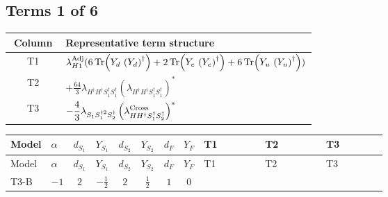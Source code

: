 \documentclass[8pt]{article}
\begin{document}
\begin{landscape}
\subsection*{Terms 1 of 6}
\begin{center}
\begin{tabular}{@{}c >{\raggedright\arraybackslash}p{0.82\linewidth}@{}}
\toprule
Column & Representative term structure \\
\midrule
T1 & \(\displaystyle {\lambda_{H1}^{\rm Adj}} (6 \operatorname{Tr}\!\left({Y_d}\,\left({Y_d}\right)^{\dagger}\right)+2 \operatorname{Tr}\!\left({Y_e}\,\left({Y_e}\right)^{\dagger}\right)+6 \operatorname{Tr}\!\left({Y_u}\,\left({Y_u}\right)^{\dagger}\right))\) \\
\midrule
T2 & \(\displaystyle +\frac{64}{3} {\lambda_{H^\dagger H^\dagger S_1^\dagger S_1^\dagger}} \left({\lambda_{H^\dagger H^\dagger S_1^\dagger S_1^\dagger}}\right)^{*}\) \\
\midrule
T3 & \(\displaystyle -\frac{4}{3} {\lambda_{S_1 S_1^{\dagger 2}S_2^\dagger}} \left({\lambda_{H H^\dagger S_1^\dagger S_2^\dagger}^{\rm Cross}}\right)^{*}\) \\
\midrule
\bottomrule
\end{tabular}
\end{center}
\smallskip
\tiny
\begin{longtable}{@{}llcccccc >{\raggedright\arraybackslash}p{0.21\linewidth} >{\raggedright\arraybackslash}p{0.21\linewidth} >{\raggedright\arraybackslash}p{0.21\linewidth}@{}}
\toprule
Model & $\alpha$ & $d_{S_1}$ & $Y_{S_1}$ & $d_{S_2}$ & $Y_{S_2}$ & $d_F$ & $Y_F$ & T1 & T2 & T3 \\
\midrule
\endfirsthead
\toprule
Model & $\alpha$ & $d_{S_1}$ & $Y_{S_1}$ & $d_{S_2}$ & $Y_{S_2}$ & $d_F$ & $Y_F$ & T1 & T2 & T3 \\
\midrule
\endhead
T3-B & $-1$ & $2$ & $-\frac{1}{2}$ & $2$ & $\frac{1}{2}$ & $1$ & $0$ & \scriptsize\adjustbox{max width=\linewidth}{$\begin{gathered} {\lambda_{H1}^{\rm Adj}} (6 \operatorname{Tr}\!\left({Y_d}\,\left({Y_d}\right)^{\dagger}\right)+2 \operatorname{Tr}\!\left({Y_e}\,\left({Y_e}\right)^{\dagger}\right)+6 \operatorname{Tr}\!\left({Y_u}\,\left({Y_u}\right)^{\dagger}\right))\end{gathered}$} & \scriptsize\adjustbox{max width=\linewidth}{$\begin{gathered} +\frac{64}{3} {\lambda_{H^\dagger H^\dagger S_1^\dagger S_1^\dagger}} \left({\lambda_{H^\dagger H^\dagger S_1^\dagger S_1^\dagger}}\right)^{*}\end{gathered}$} & \scriptsize\adjustbox{max width=\linewidth}{$\begin{gathered} -\frac{4}{3} {\lambda_{S_1 S_1^{\dagger 2}S_2^\dagger}} \left({\lambda_{H H^\dagger S_1^\dagger S_2^\dagger}^{\rm Cross}}\right)^{*}\end{gathered}$} \\

\end{longtable}
\end{landscape}
\end{document}
